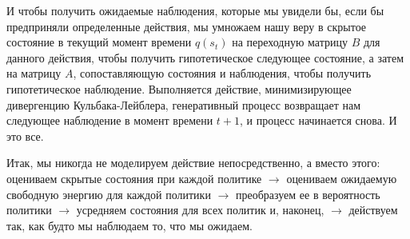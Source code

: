 \documentclass[twoside,leqno, 11pt]{article}
\begin{document}
	
	И чтобы получить ожидаемые наблюдения, которые мы увидели бы, если бы предприняли определенные действия, мы умножаем нашу веру в скрытое состояние в текущий момент времени $q(s_t)$ на переходную матрицу $B$ для данного действия, чтобы получить гипотетическое следующее состояние, а затем на матрицу $A$, сопоставляющую состояния и наблюдения, чтобы получить гипотетическое наблюдение. Выполняется действие, минимизирующее дивергенцию Кульбака-Лейблера, генеративный процесс возвращает нам следующее наблюдение в момент времени $t+1$, и процесс начинается снова. И это все.
	
	\newpage
	
	\begin{figure}[h]
	\end{figure}
	
	
	Итак, мы никогда не моделируем действие непосредственно, а вместо этого: оцениваем скрытые состояния при каждой политике $\rightarrow$ оцениваем ожидаемую свободную энергию для каждой политики $\rightarrow$ преобразуем ее в вероятность политики $\rightarrow$ усредняем состояния для всех политик и, наконец, $\rightarrow$ действуем так, как будто мы наблюдаем то, что мы ожидаем.
	
\end{document}
